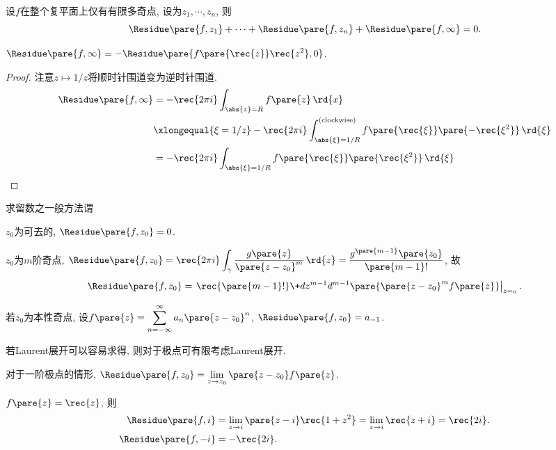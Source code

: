 \documentclass{ctexart}
\begin{document}
\begin{theorem}
    设$f$在整个复平面上仅有有限多奇点, 设为$z_1, \cdots, z_n$, 则
    \[ \Residue\pare{f,z_1} + \cdots + \Residue\pare{f,z_n} + \Residue\pare{f,\infty} = 0. \]
\end{theorem}
\begin{theorem}
    $\displaystyle \Residue\pare{f,\infty} = -\Residue\pare{f\pare{\rec{z}}\rec{z^2}, 0}$.
\end{theorem}
\begin{proof}
    注意$z\mapsto 1/z$将顺时针围道变为逆时针围道.
    \begin{align*}
        \Residue\pare{f,\infty} &= -\rec{2\pi i} \int_{\abs{z}=R}f\pare{z}\,\rd{x} \\ &\xlongequal{\xi = 1/z} -\rec{2\pi i} \int^{\mathrm{(clockwise)}}_{\abs{\xi} = 1/R} f\pare{\rec{\xi}} \pare{-\rec{\xi^2}}\,\rd{\xi} \\
        &= -\rec{2\pi i} \int_{\abs{\xi} = 1/R} f\pare{\rec{\xi}} \pare{\rec{\xi^2}}\,\rd{\xi} \qedhere
    \end{align*}
\end{proof}
求留数之一般方法谓
\begin{cenum}
    \item $z_0$为可去的, $\Residue\pare{f,z_0} = 0$.
    \item $z_0$为$m$阶奇点, $\Residue\pare{f,z_0} = \displaystyle \rec{2\pi i}\int_\gamma \frac{g\pare{z}}{\pare{z-z_0}^m}\,\rd{z} = \frac{g^{\pare{m-1}}\pare{z_0}}{\pare{m-1}!}$, 故
    \[ \Residue\pare{f,z_0} = \left.\rec{\pare{m-1}!} \+d{z^{m-1}}d{^{m-1}} \pare{\pare{z-z_0}^mf\pare{z}}\right\vert_{z=_0}. \]
    \item 若$z_0$为本性奇点, 设$\displaystyle f\pare{z} = \sum_{n=-\infty}^\infty a_n\pare{z-z_0}^n$, $\Residue\pare{f,z_0} = a_{-1}$.
\end{cenum}
\begin{remark}
    若Laurent展开可以容易求得, 则对于极点可有限考虑Laurent展开.
\end{remark}
\begin{remark}
    对于一阶极点的情形, $\Residue\pare{f,z_0} = \displaystyle \lim_{z\rightarrow z_0} \pare{z-z_0}f\pare{z}$.
\end{remark}
\begin{sample}
    \begin{ex}
        $f\pare{z} = \displaystyle \rec{z}$, 则
        \begin{align*}
            \Residue\pare{f,i} &= \lim_{z\rightarrow i} \pare{z-i}\rec{1+z^2} = \lim_{z\rightarrow i}\rec{z+i} = \rec{2i}. \\
            \Residue\pare{f,-i} &= -\rec{2i}.
        \end{align*}
    \end{ex}
\end{sample}
\end{document}
